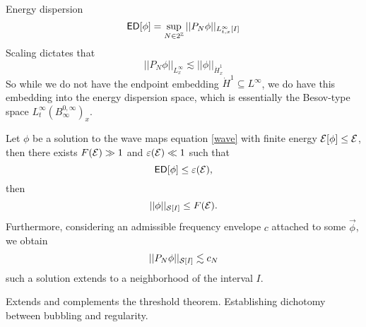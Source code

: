 


Energy dispersion
	\[ \mathsf{ED} [\phi] = \sup_{N \in 2^\mathbb Z} ||P_N \phi||_{L^\infty_{t, x} [I]} \]
Scaling dictates that 
	\[ ||P_N \phi||_{L^\infty_x} \lesssim ||\phi||_{\dot H^1_x} \]	
So while we do not have the endpoint embedding $\dot H^1 \subseteq L^\infty$, we do have this embedding into the energy dispersion space, which is essentially the Besov-type space $L^\infty_t (B^{0, \infty}_\infty)_x$. 	

\begin{theorem}
	Let $\phi$ be a solution to the wave maps equation \eqref{wave} with finite energy $\mathcal E[\phi] \leq \mathcal E$, then there exists $F(\mathcal E) \gg 1$ and $\varepsilon (\mathcal E) \ll 1$ such that 
		\[ \mathsf{ED}[\phi] \leq \varepsilon (\mathcal E), \]
	then 
		\[ ||\phi||_{\mathcal S [I]} \leq F(\mathcal E).  \]
	Furthermore, considering an admissible frequency envelope $c$ attached to some $\vec \phi$, we obtain 
		\[ ||P_N \phi||_{\mathcal S [I]} \lesssim c_N \]
	such a solution extends to a neighborhood of the interval $I$. 
\end{theorem}

Extends and complements the threshold theorem. Establishing dichotomy between bubbling and regularity. 
